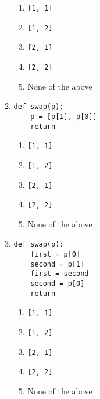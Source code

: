 \documentclass[11pt]{article}
\begin{document}
\begin{enumerate}
\begin{enumerate}
\medskip

\begin{enumerate}
\item \verb+[1, 1]+
\item \verb+[1, 2]+
\item \verb+[2, 1]+
\item \verb+[2, 2]+
\item None of the above
\end{enumerate}

\bigskip

\item 
\begin{verbatim}
def swap(p):
    p = [p[1], p[0]]
    return
\end{verbatim}

\medskip

\begin{enumerate}
\item \verb+[1, 1]+
\item \verb+[1, 2]+
\item \verb+[2, 1]+
\item \verb+[2, 2]+
\item None of the above
\end{enumerate}

\bigskip

\item 
\begin{verbatim}
def swap(p):
    first = p[0]
    second = p[1]
    first = second
    second = p[0]
    return
\end{verbatim}

\medskip

\begin{enumerate}
\item \verb+[1, 1]+
\item \verb+[1, 2]+
\item \verb+[2, 1]+
\item \verb+[2, 2]+
\item None of the above
\end{enumerate}


\end{enumerate}
\end{enumerate}
\end{document}
